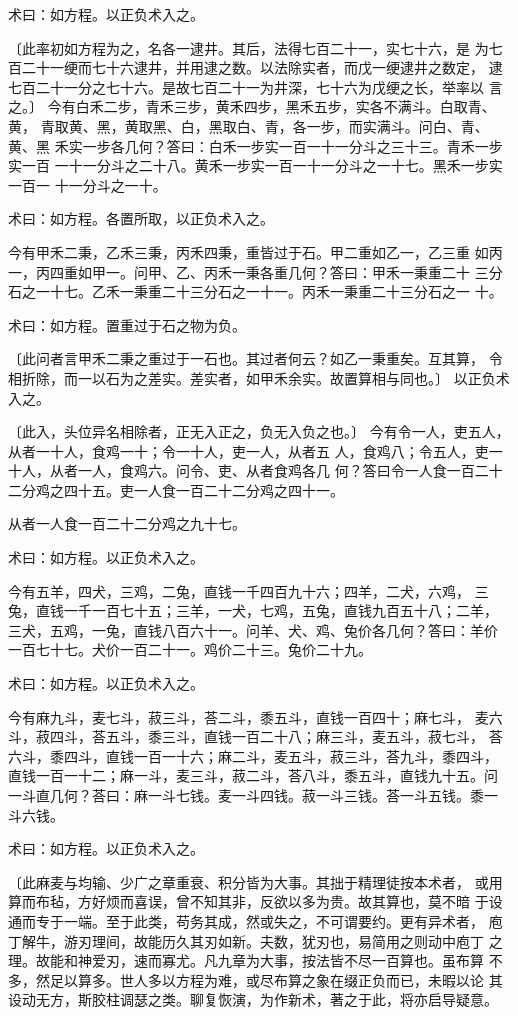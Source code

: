 \documentclass[a4paper,12pt,UTF8,twoside]{ctexbook}
\begin{document}
术曰：如方程。以正负术入之。

〔此率初如方程为之，名各一逮井。其后，法得七百二十一，实七十六，是 为七百二十一绠而七十六逮井，并用逮之数。以法除实者，而戊一绠逮井之数定， 逮七百二十一分之七十六。是故七百二十一为井深，七十六为戊绠之长，举率以 言之。〕 今有白禾二步，青禾三步，黄禾四步，黑禾五步，实各不满斗。白取青、黄， 青取黄、黑，黄取黑、白，黑取白、青，各一步，而实满斗。问白、青、黄、黑 禾实一步各几何？答曰：白禾一步实一百一十一分斗之三十三。青禾一步实一百 一十一分斗之二十八。黄禾一步实一百一十一分斗之一十七。黑禾一步实一百一 十一分斗之一十。

术曰：如方程。各置所取，以正负术入之。

今有甲禾二秉，乙禾三秉，丙禾四秉，重皆过于石。甲二重如乙一，乙三重 如丙一，丙四重如甲一。问甲、乙、丙禾一秉各重几何？答曰：甲禾一秉重二十 三分石之一十七。乙禾一秉重二十三分石之一十一。丙禾一秉重二十三分石之一 十。

术曰：如方程。置重过于石之物为负。

〔此问者言甲禾二秉之重过于一石也。其过者何云？如乙一秉重矣。互其算， 令相折除，而一以石为之差实。差实者，如甲禾余实。故置算相与同也。〕 以正负术入之。

〔此入，头位异名相除者，正无入正之，负无入负之也。〕 今有令一人，吏五人，从者一十人，食鸡一十；令一十人，吏一人，从者五 人，食鸡八；令五人，吏一十人，从者一人，食鸡六。问令、吏、从者食鸡各几 何？答曰令一人食一百二十二分鸡之四十五。吏一人食一百二十二分鸡之四十一。

从者一人食一百二十二分鸡之九十七。

术曰：如方程。以正负术入之。

今有五羊，四犬，三鸡，二兔，直钱一千四百九十六；四羊，二犬，六鸡， 三兔，直钱一千一百七十五；三羊，一犬，七鸡，五兔，直钱九百五十八；二羊， 三犬，五鸡，一兔，直钱八百六十一。问羊、犬、鸡、兔价各几何？答曰：羊价 一百七十七。犬价一百二十一。鸡价二十三。兔价二十九。

术曰：如方程。以正负术入之。

今有麻九斗，麦七斗，菽三斗，荅二斗，黍五斗，直钱一百四十；麻七斗， 麦六斗，菽四斗，荅五斗，黍三斗，直钱一百二十八；麻三斗，麦五斗，菽七斗， 荅六斗，黍四斗，直钱一百一十六；麻二斗，麦五斗，菽三斗，荅九斗，黍四斗， 直钱一百一十二；麻一斗，麦三斗，菽二斗，荅八斗，黍五斗，直钱九十五。问 一斗直几何？荅曰：麻一斗七钱。麦一斗四钱。菽一斗三钱。荅一斗五钱。黍一 斗六钱。

术曰：如方程。以正负术入之。

〔此麻麦与均输、少广之章重衰、积分皆为大事。其拙于精理徒按本术者， 或用算而布毡，方好烦而喜误，曾不知其非，反欲以多为贵。故其算也，莫不暗 于设通而专于一端。至于此类，苟务其成，然或失之，不可谓要约。更有异术者， 庖丁解牛，游刃理间，故能历久其刃如新。夫数，犹刃也，易简用之则动中庖丁 之理。故能和神爱刃，速而寡尤。凡九章为大事，按法皆不尽一百算也。虽布算 不多，然足以算多。世人多以方程为难，或尽布算之象在缀正负而已，未暇以论 其设动无方，斯胶柱调瑟之类。聊复恢演，为作新术，著之于此，将亦启导疑意。
\end{document}
